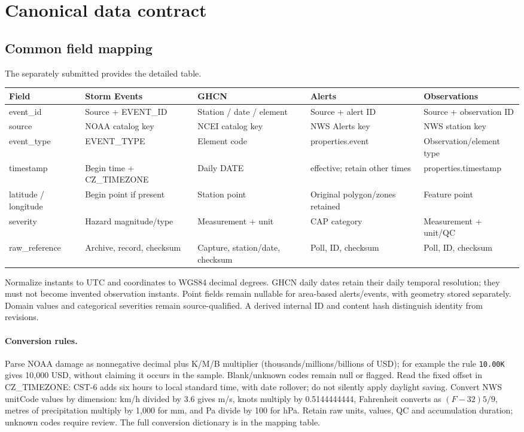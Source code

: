 \section{Canonical data contract}
\subsection{Common field mapping}
The separately submitted  provides the detailed table.
\begin{longtable}{L{2.1cm}L{3cm}L{3cm}L{3cm}L{3.8cm}}
\toprule Field & Storm Events & GHCN & Alerts & Observations \\
\midrule\endhead
event\_id & Source + EVENT\_ID & Station / date / element & Source + alert ID & Source + observation ID \\
source & NOAA catalog key & NCEI catalog key & NWS Alerts key & NWS station key \\
event\_type & EVENT\_TYPE & Element code & properties.event & Observation/element type \\
timestamp & Begin time + CZ\_TIMEZONE & Daily DATE & effective; retain other times & properties.timestamp \\
latitude / longitude & Begin point if present & Station point & Original polygon/zones retained & Feature point \\
severity & Hazard magnitude/type & Measurement + unit & CAP category & Measurement + unit/QC \\
raw\_reference & Archive, record, checksum & Capture, station/date, checksum & Poll, ID, checksum & Poll, ID, checksum \\
\bottomrule
\end{longtable}
Normalize instants to UTC and coordinates to WGS84 decimal degrees. GHCN daily
dates retain their daily temporal resolution; they must not become invented
observation instants. Point fields remain nullable for area-based alerts/events,
with geometry stored separately. Domain values and categorical severities remain
source-qualified. A derived internal ID and content hash distinguish identity
from revisions.

\paragraph{Conversion rules.} Parse NOAA damage as nonnegative decimal plus
K/M/B multiplier (thousands/millions/billions of USD); for example the rule
\texttt{10.00K} gives 10,000 USD, without claiming it occurs in the sample.
Blank/unknown codes remain null or flagged. Read the fixed offset in
CZ\_TIMEZONE: CST-6 adds six hours to local standard time, with date rollover;
do not silently apply daylight saving. Convert NWS unitCode values by dimension:
km/h divided by 3.6 gives m/s, knots multiply by 0.5144444444, Fahrenheit converts
as $(F-32)5/9$, metres of precipitation multiply by 1,000 for mm, and Pa divide
by 100 for hPa. Retain raw units, values, QC and accumulation duration; unknown
codes require review. The full conversion dictionary is in the mapping table.

